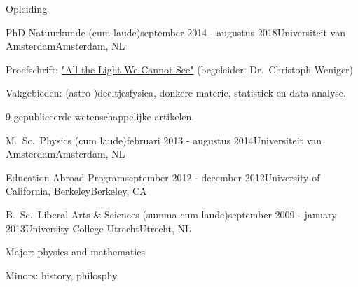 \documentclass{resume} %
\begin{document}

\begin{rSection}{Opleiding}

\begin{rSubsection}{PhD Natuurkunde (cum laude)}{september 2014 - augustus 2018}{Universiteit van Amsterdam}{Amsterdam, NL}
\vspace{-1.5em}
\item Proefschrift: \href{https://pure.uva.nl/ws/files/28193639/Thesis.pdf}{"All the Light We Cannot See"} (begeleider: Dr.~Christoph Weniger)
\item Vakgebieden: (astro-)deeltjesfysica, donkere materie, statistiek en data analyse.
\item 9 gepubliceerde wetenschappelijke artikelen.
\end{rSubsection}

\begin{rSubsection}{M.~Sc.~Physics (cum laude)}{februari 2013 - augustus 2014}{Universiteit van Amsterdam}{Amsterdam, NL}
\vspace{-1.5em}
\end{rSubsection}

\begin{rSubsection}{Education Abroad Program}{september 2012 - december 2012}{University of California, Berkeley}{Berkeley, CA}
\vspace{-1.5em}
\end{rSubsection}

\begin{rSubsection}{B.~Sc.~Liberal Arts \& Sciences (summa cum laude)}{september 2009 - january 2013}{University College Utrecht}{Utrecht, NL}
\vspace{-1.5em}
 \item Major: physics and mathematics
 \item Minors: history, philosphy
\end{rSubsection}
\end{rSection}

\end{document}
